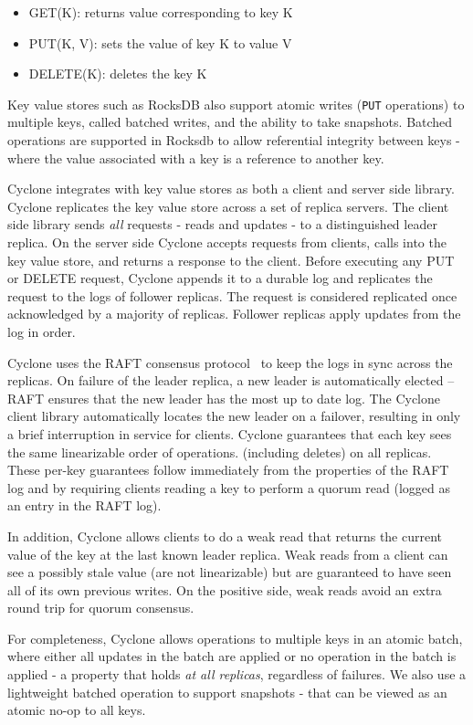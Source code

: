 \documentclass[letterpaper,twocolumn,10pt]{article}
\begin{document}
\begin{itemize}
\item GET(K): returns value corresponding to key K
\item PUT(K, V): sets the value of key K to value V
\item DELETE(K): deletes the key K
\end{itemize}

Key value stores such as RocksDB also support atomic writes ({\tt PUT}
operations) to multiple keys, called batched writes, and the ability
to take snapshots. Batched operations are supported in Rocksdb to
allow referential integrity between keys - where the value associated
with a key is a reference to another key. 

Cyclone integrates with key value stores as both a client and server
side library. Cyclone replicates the key value store across a set of
replica servers. The client side library sends \emph{all} requests -
reads and updates - to a distinguished leader replica.  On the server
side Cyclone accepts requests from clients, calls into the key value
store, and returns a response to the client. Before executing any PUT
or DELETE request, Cyclone appends it to a durable log and replicates
the request to the logs of follower replicas. The request is
considered replicated once acknowledged by a majority of
replicas. Follower replicas apply updates from the log in order.

Cyclone uses the RAFT consensus protocol~\cite{raft} to keep the logs
in sync across the replicas. On failure of the leader replica, a new
leader is automatically elected -- RAFT ensures that the new leader
has the most up to date log. The Cyclone client library automatically
locates the new leader on a failover, resulting in only a brief
interruption in service for clients.  Cyclone guarantees that each key 
sees the same linearizable order of operations. (including deletes) on
all replicas. These per-key guarantees follow immediately from the
properties of the RAFT log and by requiring clients reading a key to
perform a quorum read (logged as an entry in the RAFT log).

In addition, Cyclone allows clients to do a weak read that returns the
current value of the key at the last known leader replica. Weak reads
from a client can see a possibly stale value (are not linearizable)
but are guaranteed to have seen all of its own previous writes. On the
positive side, weak reads avoid an extra round trip for quorum
consensus.

For completeness, Cyclone allows operations to multiple keys in an
atomic batch, where either all updates in the batch are applied or no
operation in the batch is applied - a property that holds \emph{at all
  replicas}, regardless of failures.  We also use a lightweight
batched operation to support snapshots - that can be viewed as an
atomic no-op to all keys. 
\end{document}

